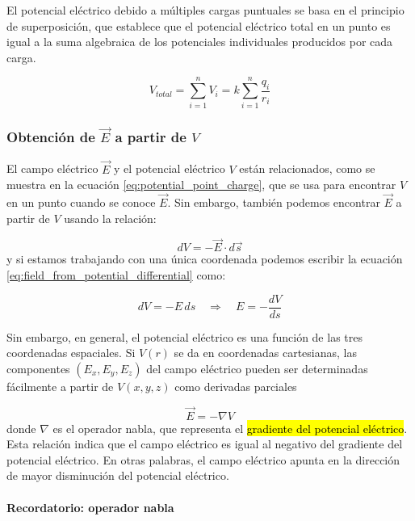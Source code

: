 El potencial eléctrico debido a múltiples cargas puntuales se basa en el principio de superposición, que establece que el potencial eléctrico total en un punto es igual a la suma algebraica de los potenciales individuales producidos por cada carga.

\begin{equation}
    V_{total} = \sum_{i=1}^{n} V_i = k \sum_{i=1}^{n} \frac{q_i}{r_i}
\end{equation}

\subsubsection{Obtención de \texorpdfstring{\(\vec{E}\)}{E} a partir de \texorpdfstring{\(V\)}{V}}

El campo eléctrico \(\vec{E}\) y el potencial eléctrico \(V\) están relacionados, como se muestra en la ecuación \eqref{eq:potential_point_charge}, que se usa para encontrar \(V\) en un punto cuando se conoce \(\vec{E}\). Sin embargo, también podemos encontrar \(\vec{E}\) a partir de \(V\) usando la relación:

\begin{equation}
    dV = -\vec{E} \cdot d\vec{s}
    \label{eq:field_from_potential_differential}
\end{equation}
y si estamos trabajando con una única coordenada podemos escribir la ecuación \eqref{eq:field_from_potential_differential} como:

\[
    dV = -E \, ds \quad \Rightarrow \quad E = -\frac{dV}{ds}
\]

Sin embargo, en general, el potencial eléctrico es una función de las tres coordenadas espaciales. Si \(V(r)\) se da en coordenadas cartesianas, las componentes \((E_x, E_y, E_z)\) del campo eléctrico pueden ser determinadas fácilmente a partir de \(V(x, y, z)\) como derivadas parciales

\begin{equation}
    \vec{E} = -\nabla V
    \label{eq:field_from_potential}
\end{equation}
donde \(\nabla\) es el operador nabla, que representa el \hl{gradiente del potencial eléctrico}. Esta relación indica que el campo eléctrico es igual al negativo del gradiente del potencial eléctrico. En otras palabras, el campo eléctrico apunta en la dirección de mayor disminución del potencial eléctrico.

\paragraph{Recordatorio: operador nabla}

